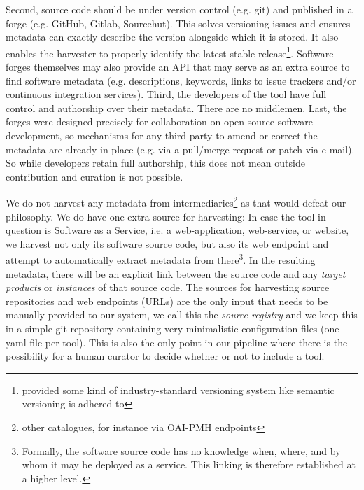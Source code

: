 \documentclass[a4paper,11pt]{article}
\begin{document}
  Second, source code should be under version control (e.g. git) and published in a forge (e.g. GitHub, Gitlab, Sourcehut).
  This solves versioning issues and ensures metadata can exactly describe the version alongside which it is stored. It also enables the 
  harvester to properly identify the latest stable release\footnote{provided some kind of industry-standard versioning system like semantic versioning is adhered to}.
  Software forges themselves may also provide an API that may serve as an extra source to find software metadata (e.g. descriptions, keywords, links to issue trackers and/or continuous integration services).
  Third, the developers of the tool have full control and authorship over their metadata. There are no middlemen.
  Last, the forges were designed precisely for collaboration on open source software development, so mechanisms for any
  third party to amend or correct the metadata are already in place (e.g. via a pull/merge request or patch via e-mail).
  So while developers retain full authorship, this does not mean outside contribution and curation is not possible.

We do not harvest any metadata from intermediaries\footnote{other catalogues,
for instance via OAI-PMH endpoints} as that would defeat our philosophy. We do
have one extra source for harvesting: In case the tool in question is Software
as a Service, i.e. a web-application, web-service, or website, we harvest not
only its software source code, but also its web endpoint and attempt to
automatically extract metadata from there\footnote{Formally, the software
source code has no knowledge when, where, and by whom it may be deployed as a
service. This linking is therefore established at a higher level.}. In the
resulting metadata, there will be an explicit link between the source code and
any \emph{target products} or \emph{instances} of that source code. The sources
for harvesting source repositories and web endpoints (URLs) are the only input
that needs to be manually provided to our system, we call this the \emph{source
registry} and we keep this in a simple git repository containing very
minimalistic configuration files (one yaml file per tool). This is also the
only point in our pipeline where there is the possibility for a human curator
to decide whether or not to include a tool.
\end{document}
